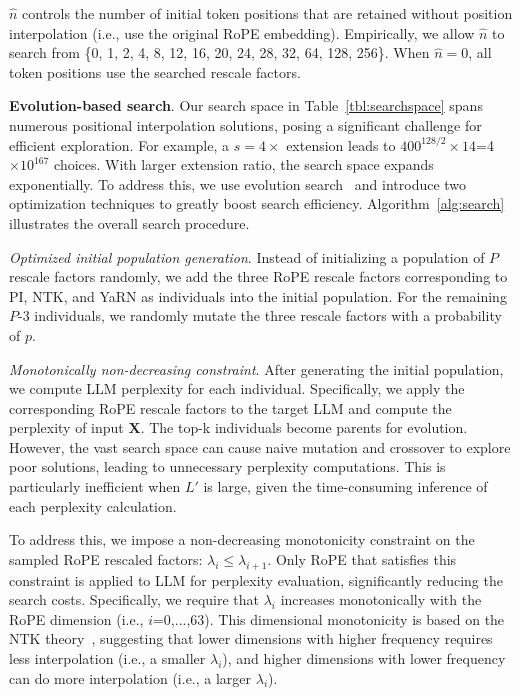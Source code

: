 $\hat{n}$ controls the number of initial token positions that are retained without position interpolation (i.e., use the original RoPE embedding). Empirically, we allow $\hat{n}$ to search from \{0, 1, 2, 4, 8, 12, 16, 20, 24, 28, 32, 64, 128, 256\}. When $\hat{n}=0$, all token positions use the searched rescale factors.

\textbf{Evolution-based search}. Our search space in Table~\ref{tbl:searchspace} spans numerous positional interpolation solutions, posing a significant challenge for efficient exploration.  For example, a $s=4\times$ extension leads to  $400^{128/2}\times14$=4$\times10^{167}$ choices. With larger extension ratio,  the search space  expands exponentially. To address this, we use evolution search~\cite{guo2020single}  and introduce  two optimization techniques to greatly boost search efficiency. Algorithm~\ref{alg:search} illustrates the overall search procedure. 

\textit{Optimized initial population generation}. Instead of initializing a population  of $P$ rescale factors randomly, we add the three RoPE rescale factors corresponding to PI, NTK, and YaRN as individuals into the initial population. For the remaining $P$-3 individuals, we randomly mutate the three rescale factors with a probability of $p$. 

\textit{Monotonically non-decreasing constraint}. After generating the initial population, we compute LLM perplexity for each individual. Specifically, we apply the corresponding RoPE rescale factors to the target LLM and compute the perplexity of  input $\mathbf{X}$. The top-k individuals become parents for evolution. However, the vast search space can cause naive mutation and crossover to explore poor solutions, leading to unnecessary perplexity computations. This is particularly inefficient when $L'$ is large, given the time-consuming inference  of each perplexity calculation.

To address this, we impose a non-decreasing monotonicity constraint on the sampled RoPE rescaled factors: $\lambda_i\le \lambda_{i+1}$.
Only RoPE that satisfies this constraint is applied to LLM for perplexity evaluation, significantly reducing the search costs. Specifically,   we require that $\lambda_i$ increases monotonically with the RoPE dimension (i.e., $i$=0,...,63). This dimensional monotonicity is based on the NTK theory~\cite{jacot2018neural,tancik2020fourier,ntk}, suggesting that lower dimensions with higher frequency requires less interpolation (i.e., a smaller $\lambda_i$), and higher dimensions with lower frequency can do more interpolation (i.e.,  a larger $\lambda_i$).

